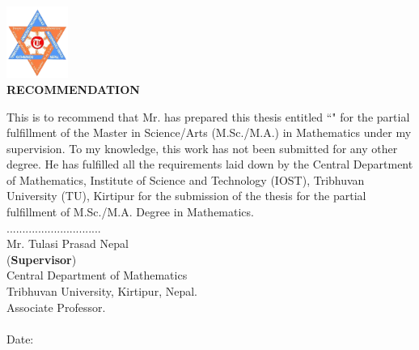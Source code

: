 
\vspace{-1cm}
\begin{center}
	\includegraphics[width=0.15\textwidth]{pictures/tulogo.png}\\[1.5cm]
	{\Large{\bfseries{RECOMMENDATION}}}\\[.5cm]
      \end{center}

This is to recommend that Mr. \textbf{\theauthor} has prepared this thesis entitled ``\textbf{\thetitle}" for the partial fulfillment of the Master in Science/Arts (M.Sc./M.A.) in Mathematics under my supervision. To my knowledge, this work has not been submitted for any other degree.
He has fulfilled all the requirements laid down by the Central Department of Mathematics, Institute of Science and Technology (IOST), Tribhuvan University (TU), Kirtipur for the submission of the thesis for the partial fulfillment of M.Sc./M.A. Degree in Mathematics.\\

\vspace{1.5cm}
\noindent
..............................\\
Mr. Tulasi Prasad Nepal\\
(\textbf{Supervisor})\\
Central Department of Mathematics\\ Tribhuvan University, Kirtipur, Nepal.\\
Associate Professor.\\ \\
Date: \thedate

\clearpage